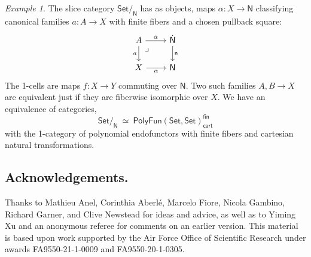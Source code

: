 \documentclass[12pt,reqno]{amsart}
\newcommand{\N}{\ensuremath{\mathbb{N}}}
\newcommand{\Set}{\ensuremath{\mathsf{Set}}}
\renewcommand{\to}{\ensuremath{\rightarrow}}
\newcommand{\n}{\ensuremath{\mathsf{n}}}
\renewcommand{\N}{\ensuremath{\mathsf{N}}}
\newcommand{\NN}{\ensuremath{\dot{\mathsf{N}}}}
\newcommand{\pbcorner}{\arrow[dr,phantom,"\lrcorner" very near start, shift right=.5ex]} %
\theoremstyle{remark}
\newtheorem{example}[theorem]{Example}
\theoremstyle{definition}
\begin{document}
\begin{example}
The slice category $\Set/_\N$ has as objects, maps $\alpha: X\to \N$ classifying canonical families  $a :A \to X$ with finite fibers and a chosen pullback square:
\begin{equation}\label{eq:classifiedfamiliesN}
\begin{tikzcd}
	 A \ar[d, swap, "a"] \pbcorner \ar[r, "\dot{\alpha}"] & \NN \ar[d, "\n"] \\  
	X \ar[r, swap, "\alpha"] & \N 
 \end{tikzcd}
 \end{equation}
 The 1-cells are maps $f : X\to Y$ commuting over $\N$.  Two such families $A, B \to X$ are equivalent just if they are fiberwise isomorphic over $X$.  We have an equivalence of categories,
\[
\Set/_\N\ \simeq\ \mathsf{PolyFun}(\Set, \Set)_{\mathsf{cart}}^\mathsf{fin}
\]
with the 1-category of polynomial endofunctors with finite fibers and cartesian natural transformations.  
\end{example}
 
\subsection*{Acknowledgements.}

\quad Thanks to Mathieu Anel, Corinthia Aberl\'e, Marcelo Fiore, Nicola Gambino, Richard Garner, and Clive Newstead for ideas and advice, as well as to Yiming Xu and an anonymous referee for comments on an earlier version.  This material is based upon work supported by the Air Force Office of Scientific Research under awards FA9550-21-1-0009 and FA9550-20-1-0305.
\end{document}
